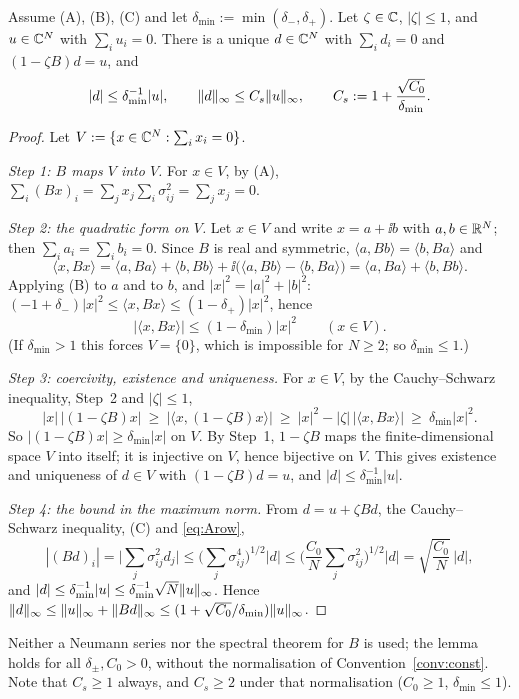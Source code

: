 \begin{lemma}\label{lem:vecstab}
Assume \textup{(A), (B), (C)} and let $\delta_{\min}:=\min(\delta_-,\delta_+)$. Let $\zeta\in\mathbb{C}$, $|\zeta|\le1$, and $u\in\mathbb{C}^N$ with $\sum_iu_i=0$. There is a unique $d\in\mathbb{C}^N$ with $\sum_id_i=0$ and $(1-\zeta B)d=u$, and
\[
 |d|\le\delta_{\min}^{-1}|u|,\qquad\|d\|_\infty\le C_s\|u\|_\infty,\qquad C_s:=1+\frac{\sqrt{C_0}}{\delta_{\min}}.
\]
\end{lemma}
\begin{proof}
Let $V:=\{x\in\mathbb{C}^N:\sum_ix_i=0\}$.

\emph{Step 1: $B$ maps $V$ into $V$.} For $x\in V$, by (A), $\sum_i(Bx)_i=\sum_jx_j\sum_i\sigma_{ij}^2=\sum_jx_j=0$.

\emph{Step 2: the quadratic form on $V$.} Let $x\in V$ and write $x=a+\ii b$ with $a,b\in\mathbb{R}^N$; then $\sum_ia_i=\sum_ib_i=0$. Since $B$ is real and symmetric, $\langle a,Bb\rangle=\langle b,Ba\rangle$ and
\[
 \langle x,Bx\rangle=\langle a,Ba\rangle+\langle b,Bb\rangle+\ii\big(\langle a,Bb\rangle-\langle b,Ba\rangle\big)=\langle a,Ba\rangle+\langle b,Bb\rangle .
\]
Applying (B) to $a$ and to $b$, and $|x|^2=|a|^2+|b|^2$: $(-1+\delta_-)|x|^2\le\langle x,Bx\rangle\le(1-\delta_+)|x|^2$, hence
\[
 |\langle x,Bx\rangle|\le(1-\delta_{\min})|x|^2\qquad(x\in V).
\]
(If $\delta_{\min}>1$ this forces $V=\{0\}$, which is impossible for $N\ge2$; so $\delta_{\min}\le1$.)

\emph{Step 3: coercivity, existence and uniqueness.} For $x\in V$, by the Cauchy--Schwarz inequality, Step~2 and $|\zeta|\le1$,
\[
 |x|\,|(1-\zeta B)x|\ \ge\ |\langle x,(1-\zeta B)x\rangle|\ \ge\ |x|^2-|\zeta|\,|\langle x,Bx\rangle|\ \ge\ \delta_{\min}|x|^2 .
\]
So $|(1-\zeta B)x|\ge\delta_{\min}|x|$ on $V$. By Step~1, $1-\zeta B$ maps the finite-dimensional space $V$ into itself; it is injective on $V$, hence bijective on $V$. This gives existence and uniqueness of $d\in V$ with $(1-\zeta B)d=u$, and $|d|\le\delta_{\min}^{-1}|u|$.

\emph{Step 4: the bound in the maximum norm.} From $d=u+\zeta Bd$, the Cauchy--Schwarz inequality, (C) and \eqref{eq:Arow},
\[
 |(Bd)_i|=\Big|\sum_j\sigma_{ij}^2d_j\Big|\le\Big(\sum_j\sigma_{ij}^4\Big)^{1/2}|d|\le\Big(\frac{C_0}N\sum_j\sigma_{ij}^2\Big)^{1/2}|d|=\sqrt{\frac{C_0}{N}}\,|d| ,
\]
and $|d|\le\delta_{\min}^{-1}|u|\le\delta_{\min}^{-1}\sqrt N\|u\|_\infty$. Hence $\|d\|_\infty\le\|u\|_\infty+\|Bd\|_\infty\le(1+\sqrt{C_0}/\delta_{\min})\|u\|_\infty$.
\end{proof}
\noindent Neither a Neumann series nor the spectral theorem for $B$ is used; the lemma holds for all $\delta_\pm,C_0>0$, without the normalisation of Convention~\ref{conv:const}.
Note that $C_s\ge1$ always, and $C_s\ge2$ under that normalisation ($C_0\ge1$, $\delta_{\min}\le1$).

